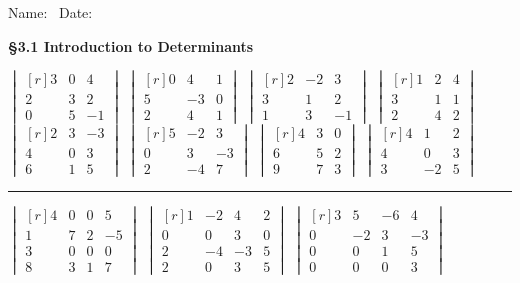 \documentclass[11pt,answers]{exam} %
\newcommand{\dett}[1]{\begin{vmatrix*}[r] #1 \end{vmatrix*}}
\begin{document}
\flushleft
Name:\ \makebox[4in]{\hrulefill} \hspace{1in} Date:\ \makebox[1in]{\hrulefill}
\begin{center}
    \textbf{\S 3.1 Introduction to Determinants}
\end{center}


\begin{questions}
    \question $\dett{3 & 0 & 4 \\ 2 & 3 & 2 \\ 0 & 5 & -1}$
    \question $\dett{0 & 4 & 1 \\ 5 & -3 & 0 \\ 2 & 4 & 1}$
    \question $\dett{2 & -2 & 3 \\ 3 & 1 & 2 \\ 1 & 3 & -1}$
    \question $\dett{1 & 2 & 4 \\ 3 & 1 & 1 \\ 2 & 4 & 2}$
    \question $\dett{2 & 3 & -3 \\ 4 & 0 & 3 \\ 6 & 1 & 5}$
    \question $\dett{5 & -2 & 3 \\ 0 & 3 & -3 \\ 2 & -4 & 7}$
    \question $\dett{4 & 3 & 0 \\ 6 & 5 & 2 \\ 9 & 7 & 3}$
    \question $\dett{4 & 1 & 2 \\ 4 & 0 & 3 \\ 3 & -2 & 5}$
    \begin{center}\rule{4in}{0.1mm}\end{center}
    \question $\dett{4 & 0 & 0 & 5 \\ 1 & 7 & 2 & -5 \\ 3 & 0 & 0 & 0 \\ 8 & 3 & 1 & 7}$
    \question $\dett{1 & -2 & 4 & 2 \\ 0 & 0 & 3 & 0 \\ 2 & -4 & -3 & 5 \\ 2 & 0 & 3 & 5}$
    \question $\dett{3 & 5 & -6 & 4 \\ 0 & -2 & 3 & -3 \\ 0 & 0 & 1 & 5 \\ 0 & 0 & 0 & 3}$

\end{questions}
\end{document}

